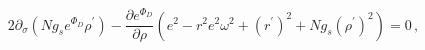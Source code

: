 \begin{equation}
\label{eq-rho}
2 \partial_\sigma\left(N g_s e^{\Phi_D} \rho^\prime \right) - \frac{\partial e^{\Phi_D}}{\partial \rho}
\left( e^2-r^2 e^2 \omega^2+ (r^\prime)^2 + N g_s (\rho^\prime)^2 \right) = 0\,,
\end{equation}

